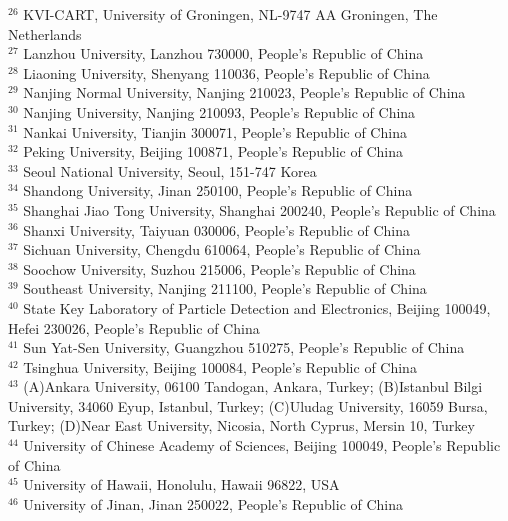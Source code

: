 \begin{small}
\begin{center}
{$^{26}$ KVI-CART, University of Groningen, NL-9747 AA Groningen, The Netherlands\\
$^{27}$ Lanzhou University, Lanzhou 730000, People's Republic of China\\
$^{28}$ Liaoning University, Shenyang 110036, People's Republic of China\\
$^{29}$ Nanjing Normal University, Nanjing 210023, People's Republic of China\\
$^{30}$ Nanjing University, Nanjing 210093, People's Republic of China\\
$^{31}$ Nankai University, Tianjin 300071, People's Republic of China\\
$^{32}$ Peking University, Beijing 100871, People's Republic of China\\
$^{33}$ Seoul National University, Seoul, 151-747 Korea\\
$^{34}$ Shandong University, Jinan 250100, People's Republic of China\\
$^{35}$ Shanghai Jiao Tong University, Shanghai 200240, People's Republic of China\\
$^{36}$ Shanxi University, Taiyuan 030006, People's Republic of China\\
$^{37}$ Sichuan University, Chengdu 610064, People's Republic of China\\
$^{38}$ Soochow University, Suzhou 215006, People's Republic of China\\
$^{39}$ Southeast University, Nanjing 211100, People's Republic of China\\
$^{40}$ State Key Laboratory of Particle Detection and Electronics, Beijing 100049, Hefei 230026, People's Republic of China\\
$^{41}$ Sun Yat-Sen University, Guangzhou 510275, People's Republic of China\\
$^{42}$ Tsinghua University, Beijing 100084, People's Republic of China\\
$^{43}$ (A)Ankara University, 06100 Tandogan, Ankara, Turkey; (B)Istanbul Bilgi University, 34060 Eyup, Istanbul, Turkey; (C)Uludag University, 16059 Bursa, Turkey; (D)Near East University, Nicosia, North Cyprus, Mersin 10, Turkey\\
$^{44}$ University of Chinese Academy of Sciences, Beijing 100049, People's Republic of China\\
$^{45}$ University of Hawaii, Honolulu, Hawaii 96822, USA\\
$^{46}$ University of Jinan, Jinan 250022, People's Republic of China\\
}
\end{center}
\end{small}
